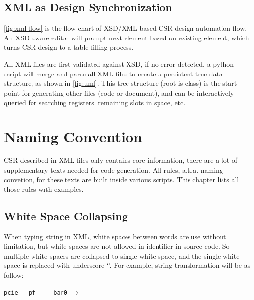 \documentclass[10pt,oneside]{book}
\begin{document}
\section{XML as Design Synchronization}
\autoref{fig:xml-flow} is the flow chart of XSD/XML based CSR design
automation flow. An XSD aware editor will prompt next element based on
existing element, which turns CSR design to a table filling process.


All XML files are first validated against XSD, if no error detected, 
a python script will merge and parse all XML files to create a persistent
tree data structure, as shown in \autoref{fig:uml}. 
This tree structure (root is  class) is the start point for generating 
other files (code or document), and can be interactively queried for searching
registers, remaining slots in space, etc. 


\chapter{Naming Convention}\label{sec:naming}
CSR described in XML files only contains core information, there are
a lot of supplementary texts needed for code generation. All rules, a.k.a.
naming convetion, for these texts are built inside various scripts. This chapter
lists all those rules with examples. 

\section{White Space Collapsing}
When typing string in XML, white spaces between words 
are use without limitation, but white spaces are not 
allowed in identifier in source code. So multiple white
spaces are collapsed to single white space, and the single
white space is replaced with underscore `\mhdl{_}'. For 
example, string transformation will be as follow:
\begin{center}
\lstinline[showspaces=true,basicstyle=\tt]{pcie   pf     bar0}
$\rightarrow$ 
\end{center}
\end{document}
